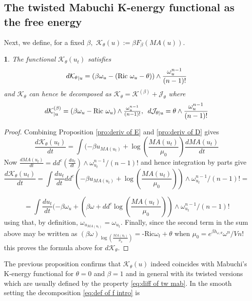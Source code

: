 \documentclass[11pt,oneside,english]{amsart}
\numberwithin{equation}{section}
\numberwithin{figure}{section}
\theoremstyle{plain}
\theoremstyle{plain}
\theoremstyle{plain}
\theoremstyle{plain}
\newtheorem{prop}[thm]{\protect\propositionname}
\theoremstyle{remark}
\theoremstyle{definition}
\providecommand{\propositionname}{Proposition}
\begin{document}
\subsection{\label{sub:The-free-energy}The twisted Mabuchi K-energy functional
as the free energy}

Next, we define, for a fixed $\beta,$ $\mathcal{K}_{\theta}(u):=\beta F_{\beta}(MA(u)).$ 
\begin{prop}
\label{pro:var def of k}The functional $\mathcal{K}_{\theta}(u_{t})$
satisfies 
\begin{equation}
d\mathcal{K_{\theta}}_{|u}=(\beta\omega_{u}-\mbox{(Ric \ensuremath{\omega_{u}-\theta}}))\wedge\frac{\omega_{u}^{n-1}}{(n-1)!}\label{eq:diff of tw mab}
\end{equation}
 and $\mathcal{K}_{\theta}$ can hence be decomposed as $\mathcal{K}_{\theta}=\mathcal{K}^{(\beta)}+\mathcal{J}_{\theta}$
where 
\[
d\mathcal{K}_{|u}^{(\beta)}=(\beta\omega_{u}-\mbox{Ric \ensuremath{\omega_{u})\wedge\frac{\omega_{u}^{n-1}}{(n-1)!},\,\,\, d\mathcal{J}_{\theta|u}=\theta}}\wedge\frac{\omega_{u}^{n-1}}{(n-1)!}
\]
 \end{prop}
\begin{proof}
Combining Proposition \ref{pro:deriv of E} and \ref{pro:deriv of D}
gives
\[
\frac{d\mathcal{K}_{\theta}(u_{t})}{dt}=\int(-\beta u_{MA(u_{t})}+\log(\frac{MA(u_{t})}{\mu_{0}})\frac{dMA(u_{t})}{dt}
\]
 Now $\frac{dMA(u_{t})}{dt}=dd^{c}(\frac{du_{t}}{dt})\wedge\omega_{u_{t}}^{n-1}/(n-1)!$
and hence integration by parts give 
\[
\frac{d\mathcal{K}_{\theta}(u_{t})}{dt}=\int\frac{du_{t}}{dt}dd^{c}(-\beta u_{MA(u_{t})}+\log(\frac{MA(u_{t})}{\mu_{0}}))\wedge\omega_{u_{t}}^{n-1}/(n-1)!=
\]
 
\[
=\int\frac{du_{t}}{dt}(-\beta\omega_{u}+(\beta\omega+dd^{c}\log(\frac{MA(u_{t})}{\mu_{0}}))\wedge\omega_{u_{t}}^{n-1}/(n-1)!
\]
 using that, by definition, $\omega_{u_{MA(u_{t})}}=\omega_{u_{t}}.$
Finally, since the second term in the sum above may be written as
$(\beta\omega)_{\log(\frac{MA(u_{t})}{\mu_{0}})}=\mbox{-Ric}\ensuremath{\omega_{t}}+\theta$
when $\mu_{0}=e^{\beta h_{\omega,\theta}}\omega^{n}/Vn!$ this proves
the formula above for $d\mathcal{K_{\theta}}.$ 
\end{proof}
The previous proposition confirms that $\mathcal{K}_{\theta}(u)$
indeed coincides with Mabuchi's K-energy functional for $\theta=0$
and $\beta=1$ \cite{m2} and in general with its twisted versions
\cite{s-t,st} which are usually defined by the property \ref{eq:diff of tw mab}.
In the smooth setting the decomposition \ref{eq:def of f intro} is
\end{document}
